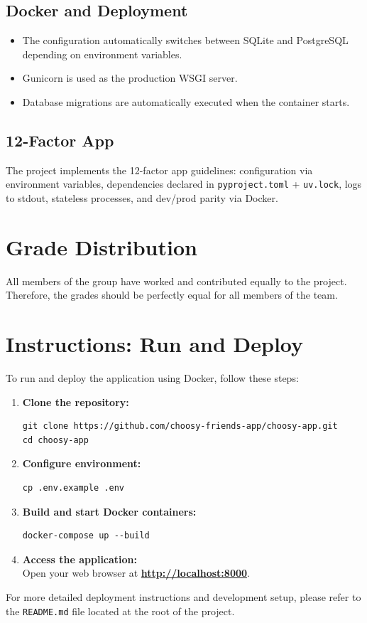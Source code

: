 \documentclass[a4paper,11pt]{article}
\begin{document}
\subsection{Docker and Deployment}
\begin{itemize}
    \item The configuration automatically switches between SQLite and PostgreSQL depending on environment variables.
    \item Gunicorn is used as the production WSGI server.
    \item Database migrations are automatically executed when the container starts.
\end{itemize}

\subsection{12-Factor App}
The project implements the 12-factor app guidelines: configuration via environment variables, dependencies declared in \texttt{pyproject.toml} + \texttt{uv.lock}, logs to stdout, stateless processes, and dev/prod parity via Docker.

\section{Grade Distribution}

\noindent All members of the group have worked and contributed equally to the project. Therefore, the grades should be perfectly equal for all members of the team.

\section{Instructions: Run and Deploy}

To run and deploy the application using Docker, follow these steps:

\begin{enumerate}
    \item \textbf{Clone the repository:}
\begin{lstlisting}
git clone https://github.com/choosy-friends-app/choosy-app.git
cd choosy-app
\end{lstlisting}

    \item \textbf{Configure environment:}
\begin{lstlisting}
cp .env.example .env
\end{lstlisting}

    \item \textbf{Build and start Docker containers:}
\begin{lstlisting}
docker-compose up --build
\end{lstlisting}

    \item \textbf{Access the application:} \\
    Open your web browser at \textbf{\url{http://localhost:8000}}.
\end{enumerate}

\noindent For more detailed deployment instructions and development setup, please refer to the \texttt{README.md} file located at the root of the project.
\end{document}
